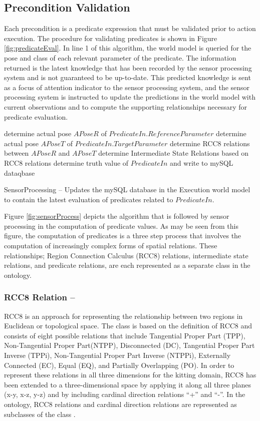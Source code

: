 \subsection{Precondition Validation}
\label{sect:preconditionValid}
Each precondition is a predicate expression that must be validated prior to
action execution.
The procedure for validating predicates is shown in Figure \ref{fig:predicateEval}. In line 1 of this algorithm, the world
model is queried for the pose and class of each relevant 
parameter of the predicate. The information returned is the 
latest knowledge that has been recorded by the sensor processing
system and is not guaranteed to be up-to-date. This predicted
knowledge is sent as a focus of attention indicator to the sensor
processing system, and the sensor processing system is instructed to
update the predictions in the world model with current observations
and to compute the supporting relationships necessary for predicate
evaluation.
%
\begin{algorithm}[h!]
 	determine actual pose $APoseR$ of $PredicateIn.ReferenceParameter$\;
 	determine actual pose $APoseT$ of $PredicateIn.TargetParameter$\;
 	determine RCC8 relations between $APoseR$ and $APoseT$\;
 	determine Intermediate State Relations based on RCC8 relations\;
 	determine truth value of $PredicateIn$ and write to mySQL dataqbase\;
\caption{{\sc SensorProcessing} -- Updates the mySQL database in the Execution world model
to contain the latest evaluation of predicates related to $PredicateIn$.}
\label{fig:sensorProcess}
\end{algorithm}
%
Figure \ref{fig:sensorProcess} depicts the algorithm that is followed by
sensor processing in the computation of predicate values. As may be seen from this
figure, the computation of predicates is a three step process that involves
the computation of increasingly complex forms of spatial relations. These
relationships; Region Connection Calculus (RCC8) relations, intermediate state relations, and predicate relations, are each represented as a separate class in
the ontology.
%
\subsubsection{RCC8 Relation --}
RCC8 \cite{Wolter2000} is an approach for representing the relationship between two regions in Euclidean or topological space. The class  
is based on the definition of RCC8 and consists of eight possible relations that include Tangential Proper Part (TPP), Non-Tangential Proper Part(NTPP), Disconnected (DC), Tangential Proper Part Inverse (TPPi), Non-Tangential Proper Part Inverse (NTPPi), Externally Connected (EC), Equal (EQ), and Partially Overlapping (PO). In order to represent these relations in all three dimensions for the kitting domain, RCC8 has been extended to a three-dimensional space by applying it along all three planes (x-y, x-z, y-z) and by including cardinal direction relations ``+'' and ``-''. In the ontology, RCC8 relations and cardinal direction relations are represented as subclasses of the class . 
%
